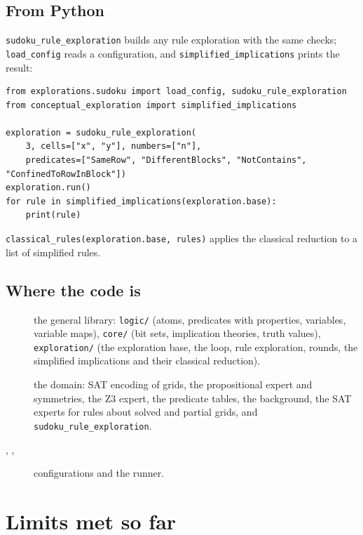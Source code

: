 \documentclass[11pt,a4paper]{article}
\theoremstyle{definition}
\theoremstyle{remark}
\newcommand{\code}[1]{\texttt{#1}}
\begin{document}
\subsection{From Python}

\code{sudoku\_rule\_exploration} builds any rule exploration with the same checks; \code{load\_config} reads a configuration, and \code{simplified\_implications} prints the result:
\begin{Verbatim}
from explorations.sudoku import load_config, sudoku_rule_exploration
from conceptual_exploration import simplified_implications

exploration = sudoku_rule_exploration(
    3, cells=["x", "y"], numbers=["n"],
    predicates=["SameRow", "DifferentBlocks", "NotContains", "ConfinedToRowInBlock"])
exploration.run()
for rule in simplified_implications(exploration.base):
    print(rule)
\end{Verbatim}
\code{classical\_rules(exploration.base, rules)} applies the classical reduction to a list of simplified rules.

\subsection{Where the code is}

\begin{description}
  \item[] the general library: \code{logic/} (atoms, predicates with properties, variables, variable maps), \code{core/} (bit sets, implication theories, truth values), \code{exploration/} (the exploration base, the loop, rule exploration, rounds, the simplified implications and their classical reduction).
  \item[] the domain: SAT encoding of grids, the propositional expert and symmetries, the Z3 expert, the predicate tables, the background, the SAT experts for rules about solved and partial grids, and \code{sudoku\_rule\_exploration}.
  \item[, , ] configurations and the runner.
\end{description}

\section{Limits met so far}\label{sec:limits}
\end{document}
